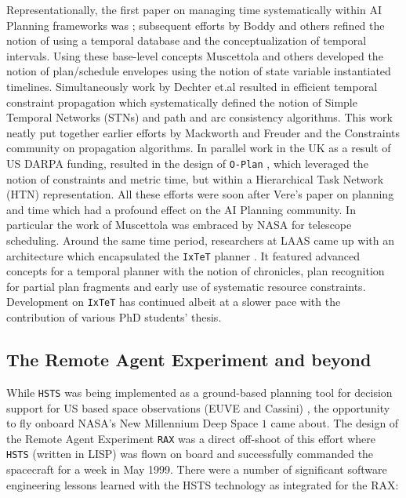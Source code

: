 Representationally, the first paper on managing time systematically
within AI Planning frameworks was \cite{dean87}; subsequent efforts by
Boddy and others \cite{Dean88,Boddy93} refined the notion of using a
temporal database and the conceptualization of temporal
intervals. Using these base-level concepts Muscettola and others
\cite{mus92, ghallab94, laborie95, cesta96} developed the notion of
plan/schedule envelopes using the notion of state variable
instantiated timelines. Simultaneously work by Dechter et.al
\cite{dechter91} resulted in efficient temporal constraint propagation
which systematically defined the notion of Simple Temporal Networks
(STNs) and path and arc consistency algorithms. This work neatly put
together earlier efforts by Mackworth and Freuder \cite{mackworth77,
  mack85} and the Constraints community on propagation algorithms. In
parallel work in the UK as a result of US DARPA funding, resulted in
the design of \texttt{O-Plan} \cite{currie91}, which leveraged the
notion of constraints and metric time, but within a Hierarchical Task
Network (HTN) representation. All these efforts were soon after Vere’s
paper on planning and time \cite{vere83} which had a profound effect
on the AI Planning community. In particular the work of Muscettola
\cite{mus94} was embraced by NASA for telescope scheduling. Around the
same time period, researchers at LAAS came up with an architecture
\cite{alami:1998p820} which encapsulated the \texttt{IxTeT} planner
\cite{ghallab94}. It featured advanced concepts for a temporal planner
with the notion of chronicles, plan recognition for partial plan
fragments and early use of systematic resource
constraints. Development on \texttt{IxTeT} has continued albeit at a
slower pace with the contribution of various PhD students’ thesis.

\subsection{The Remote Agent Experiment and beyond}

While \texttt{HSTS} \cite{mus94} was being implemented as a
ground-based planning tool for decision support for US based space
observations (EUVE and Cassini) \cite{mus95}, the opportunity to fly
onboard NASA’s New Millennium Deep Space $1$ came about. The design of
the Remote Agent Experiment \texttt{RAX} \cite{pell97, bernard98,
  pell98, mus98, DS1report, rajan00, jonsson00} was a direct off-shoot
of this effort where \texttt{HSTS} (written in LISP) was flown on
board and successfully commanded the spacecraft for a week in May
1999. There were a number of significant software engineering lessons
learned with the HSTS technology as integrated for the RAX:

